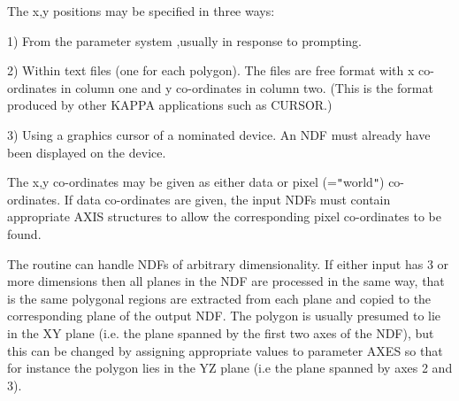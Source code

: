\begin{small}
{{      The x,y positions may be specified in three ways:

      1) From the parameter system ,usually in response to prompting.

      2) Within text files (one for each polygon). The files are free
      format with x co-ordinates in column one and y co-ordinates in
      column two. (This is the format produced by other KAPPA
      applications such as CURSOR.)

      3) Using a graphics cursor of a nominated device. An NDF must
      already have been displayed on the device.

      The x,y co-ordinates may be given as either data or pixel
      (={\tt "}world{\tt "}) co-ordinates. If data co-ordinates are given, the input
      NDFs must contain appropriate AXIS structures to allow the
      corresponding pixel co-ordinates to be found.

      The routine can handle NDFs of arbitrary dimensionality. If
      either input has 3 or more dimensions then all planes in the NDF
      are processed in the same way, that is the same polygonal regions
      are extracted from each plane and copied to the corresponding
      plane of the output NDF. The polygon is usually presumed to lie
      in the XY plane (i.e. the plane spanned by the first two axes of
      the NDF), but this can be changed by assigning appropriate values
      to parameter AXES so that for instance the polygon lies in the YZ
      plane (i.e the plane spanned by axes 2 and 3).
   }
   }
\end{small}
